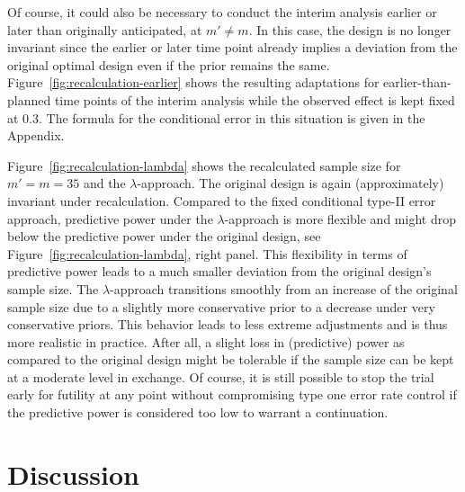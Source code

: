 \documentclass{article}
\begin{document}
Of course, it could also be necessary to conduct the interim analysis earlier or later than originally anticipated, at $m'\neq m$. 
In this case, the design is no longer invariant since the earlier 
or later time point already implies a deviation from the 
original optimal design even if the prior remains the same.
Figure~\ref{fig:recalculation-earlier} shows the resulting adaptations
for earlier-than-planned time points of the interim analysis 
while the observed effect is kept fixed at $0.3$.
The formula for the conditional error in this situation is given in the Appendix.

Figure~\ref{fig:recalculation-lambda} shows the recalculated sample size
for $m'=m=35$ and the $\lambda$-approach. 
The original design is again (approximately) invariant under recalculation.
Compared to the fixed conditional type-II error approach, predictive power 
under the $\lambda$-approach is more flexible and might drop below the predictive power under the original design, see Figure~\ref{fig:recalculation-lambda}, right panel.
This flexibility in terms of predictive power leads to a much smaller deviation from the original design's sample size.
The $\lambda$-approach transitions smoothly from 
an increase of the original sample size due to a slightly more conservative prior to a decrease under very conservative priors.
This behavior leads to less extreme adjustments and is thus 
more realistic in practice.
After all, a slight loss in (predictive) power as compared to the
original design might be tolerable if the sample size can be kept at
a moderate level in exchange. 
Of course, it is still possible to stop the trial early for futility
at any point without compromising type one error rate control 
if the predictive power is considered too low to warrant a continuation. 



\section{Discussion} %
\end{document}
